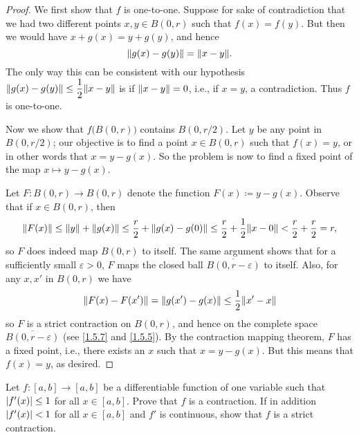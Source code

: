 \begin{proof}
  We first show that \(f\) is one-to-one.
  Suppose for sake of contradiction that we had two different points \(x, y \in B(0, r)\) such that \(f(x) = f(y)\).
  But then we would have \(x + g(x) = y + g(y)\), and hence
  \[
    \norm*{g(x) - g(y)} = \norm*{x - y}.
  \]
  The only way this can be consistent with our hypothesis \(\norm*{g(x) - g(y)} \leq \dfrac{1}{2} \norm*{x - y}\) is if \(\norm*{x - y} = 0\), i.e., if \(x = y\), a contradiction.
  Thus \(f\) is one-to-one.

  Now we show that \(f\big(B(0, r)\big)\) contains \(B(0, r / 2)\).
  Let \(y\) be any point in \(B(0, r / 2)\);
  our objective is to find a point \(x \in B(0, r)\) such that \(f(x) = y\), or in other words that \(x = y - g(x)\).
  So the problem is now to find a fixed point of the map \(x \mapsto y - g(x)\).

  Let \(F : B(0, r) \to B(0, r)\) denote the function \(F(x) \coloneqq y - g(x)\).
  Observe that if \(x \in B(0, r)\), then
  \[
    \norm*{F(x)} \leq \norm*{y} + \norm*{g(x)} \leq \dfrac{r}{2} + \norm*{g(x) - g(0)} \leq \dfrac{r}{2} + \dfrac{1}{2} \norm*{x - 0} < \dfrac{r}{2} + \dfrac{r}{2} = r,
  \]
  so \(F\) does indeed map \(B(0, r)\) to itself.
  The same argument shows that for a sufficiently small \(\varepsilon > 0\), \(F\) maps the closed ball \(\overline{B(0, r - \varepsilon)}\) to itself.
  Also, for any \(x, x'\) in \(B(0, r)\) we have
  \[
    \norm*{F(x) - F(x')} = \norm*{g(x') - g(x)} \leq \dfrac{1}{2} \norm*{x' - x}
  \]
  so \(F\) is a strict contraction on \(B(0, r)\), and hence on the complete space \(\overline{B(0, r - \varepsilon)}\) (see \cref{1.5.7} and \cref{1.5.5}).
  By the contraction mapping theorem, \(F\) has a fixed point, i.e., there exists an \(x\) such that \(x = y - g(x)\).
  But this means that \(f(x) = y\), as desired.
\end{proof}

\exercisesection

\begin{ex}\label{ex:6.6.1}
  Let \(f : [a, b] \to [a, b]\) be a differentiable function of one variable such that \(\abs{f'(x)} \leq 1\) for all \(x \in [a, b]\).
  Prove that \(f\) is a contraction.
  If in addition \(\abs{f'(x)} < 1\) for all \(x \in [a, b]\) and \(f'\) is continuous, show that \(f\) is a strict contraction.
\end{ex}

